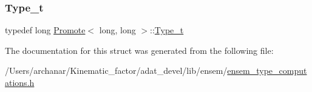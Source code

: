 \subsubsection{\texorpdfstring{Type\_t}{Type\_t}\hspace{0.1cm}{\footnotesize\ttfamily [2/2]}}
{\footnotesize\ttfamily typedef long \mbox{\hyperlink{structPromote}{Promote}}$<$ long, long $>$\+::\mbox{\hyperlink{structPromote_3_01long_00_01long_01_4_a5f00bb17e1f226cbed5e9b1ab9e96081}{Type\+\_\+t}}}



The documentation for this struct was generated from the following file\+:\begin{DoxyCompactItemize}
\item 
/\+Users/archanar/\+Kinematic\+\_\+factor/adat\+\_\+devel/lib/ensem/\mbox{\hyperlink{lib_2ensem_2ensem__type__computations_8h}{ensem\+\_\+type\+\_\+computations.\+h}}\end{DoxyCompactItemize}
